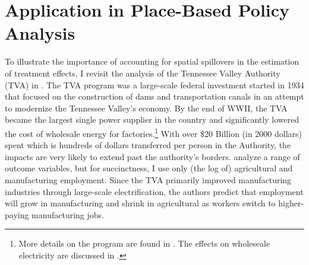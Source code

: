 \documentclass[11pt]{article}
\begin{document}
\section{Application in Place-Based Policy Analysis}
\label{sec:tva}

To illustrate the importance of accounting for spatial spillovers in the estimation of treatment effects, I revisit the analysis of the Tennessee Valley Authority (TVA) in \citet{Kline_Moretti_2014}. The TVA program was a large-scale federal investment started in 1934 that focused on the construction of dams and transportation canals in an attempt to modernize the Tennessee Valley's economy. By the end of WWII, the TVA became the largest single power supplier in the country and significantly lowered the cost of wholesale energy for factories.\footnote{More details on the program are found in \citet{Kline_Moretti_2014}. The effects on wholeseale electricity are discussed in \citet{Kitchens_2014}.} With over \$20 Billion (in 2000 dollars) spent which is hundreds of dollars transferred per person in the Authority, the impacts are very likely to extend past the authority's borders. \citet{Kline_Moretti_2014} analyze a range of outcome variables, but for succinctness, I use only (the log of) agricultural and manufacturing employment. Since the TVA primarily improved manufacturing industries through large-scale electrification, the authors predict that employment will grow in manufacturing and shrink in agricultural as workers switch to higher-paying manufacturing jobs. 
\end{document}
